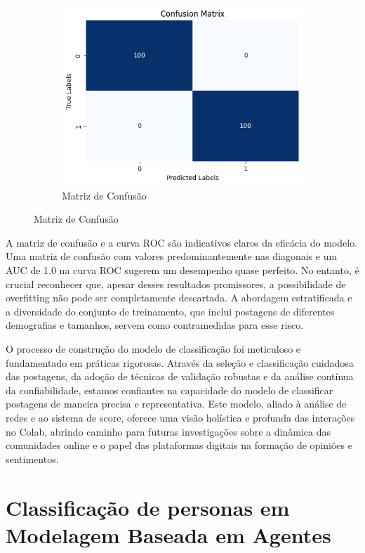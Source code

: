 \begin{figure}[htb]
\begin{subfigure}[b]{0.49\textwidth}
		\includegraphics[width=\textwidth]{images/persona_confusion_matrix.png}
		\caption{Matriz de Confusão}
		\label{fig:persona_confusion_matrix}
	\end{subfigure}
	\fautor
\end{figure}

A matriz de confusão e a curva ROC são indicativos claros da eficácia do modelo. Uma matriz de confusão com valores predominantemente nas diagonais e um AUC de 1.0 na curva ROC sugerem um desempenho quase perfeito. No entanto, é crucial reconhecer que, apesar desses resultados promissores, a possibilidade de overfitting não pode ser completamente descartada. A abordagem estratificada e a diversidade do conjunto de treinamento, que inclui postagens de diferentes demografias e tamanhos, servem como contramedidas para esse risco.

O processo de construção do modelo de classificação foi meticuloso e fundamentado em práticas rigorosas. Através da seleção e classificação cuidadosa das postagens, da adoção de técnicas de validação robustas e da análise contínua da confiabilidade, estamos confiantes na capacidade do modelo de classificar postagens de maneira precisa e representativa. Este modelo, aliado à análise de redes e ao sistema de score, oferece uma visão holística e profunda das interações no Colab, abrindo caminho para futuras investigações sobre a dinâmica das comunidades online e o papel das plataformas digitais na formação de opiniões e sentimentos.

\section{Classificação de personas em Modelagem Baseada em Agentes}

